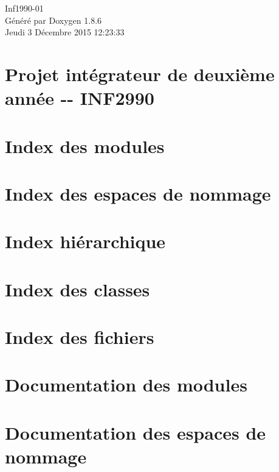 \documentclass[twoside]{book}
\newcommand{\clearemptydoublepage}{%
  \newpage{\pagestyle{empty}\cleardoublepage}%
}
\begin{document}
\hypersetup{pageanchor=false}
\begin{titlepage}
\vspace*{7cm}
\begin{center}%
{\Large Inf1990-\/01 }\\
\vspace*{1cm}
{\large Généré par Doxygen 1.8.6}\\
\vspace*{0.5cm}
{\small Jeudi 3 Décembre 2015 12:23:33}\\
\end{center}
\end{titlepage}
\clearemptydoublepage
\tableofcontents
\clearemptydoublepage
{}
\hypersetup{pageanchor=true}

\chapter{Projet intégrateur de deuxième année -\/-\/ I\-N\-F2990}
\label{index}\hypertarget{index}{}
\chapter{Index des modules}

\chapter{Index des espaces de nommage}

\chapter{Index hiérarchique}

\chapter{Index des classes}

\chapter{Index des fichiers}

\chapter{Documentation des modules}





\chapter{Documentation des espaces de nommage}






\end{document}
